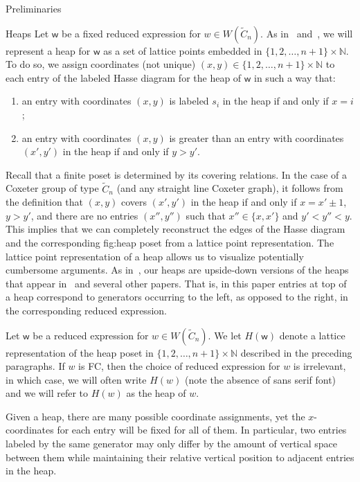 \documentclass[11pt]{amsart}
\theoremstyle{definition}
\numberwithin{equation}{section}
\newcommand{\N}{\mathbb{N}}
\newcommand{\C}{\widetilde{C}}
\renewcommand{\(}{\left(}
\renewcommand{\)}{\right)}
\newcommand{\w}{\mathsf{w}}
\begin{document}
\begin{section}{Preliminaries}
\begin{subsection}{Heaps}
Let $\w$ be a fixed reduced expression for $w \in W(\C_{n})$.  As in~\cite{Billey2007} and~\cite{Ernst2010}, we will represent a heap for $\w$ as a set of lattice points embedded in $\{1,2,\ldots,n+1\} \times \mathbb{N}$.  To do so, we assign coordinates (not unique) $(x,y) \in \{1,2,\ldots, n+1\} \times \mathbb{N}$ to each entry of the labeled Hasse diagram for the heap of $\w$ in such a way that:
\begin{enumerate}
\item an entry with coordinates $(x,y)$ is labeled $s_i$ in the heap if and only if $x = i$; 
\item an entry with coordinates $(x,y)$ is greater than an entry with coordinates $(x',y')$ in the heap if and only if $y > y'$.
\end{enumerate}
Recall that a finite poset is determined by its covering relations.  In the case of a Coxeter group of type $\C_{n}$ (and any straight line Coxeter graph), it follows from the definition that $(x,y)$ covers $(x',y')$ in the heap if and only if $x = x' \pm 1$, $y > y'$, and there are no entries $(x'', y'')$ such that $x'' \in \{x, x'\}$ and $y'< y'' < y$.  This implies that we can completely reconstruct the edges of the Hasse diagram and the corresponding fig:heap poset from a lattice point representation. The lattice point representation of a heap allows us to visualize potentially cumbersome arguments.  As in~\cite{Ernst2010}, our heaps are upside-down versions of the heaps that appear in~\cite{Billey2007} and several other papers.  That is, in this paper entries at top of a heap correspond to generators occurring to the left, as opposed to the right, in the corresponding reduced expression. 

Let $\w$ be a reduced expression for $w \in W(\C_{n})$.  We let $H(\w)$ denote a lattice representation of the heap poset in $\{1,2,\ldots,n+1\} \times \N$ described in the preceding paragraphs.  If $w$ is FC, then the choice of reduced expression for $w$ is irrelevant, in which case, we will often write $H(w)$ (note the absence of \textsf{sans serif} font) and we will refer to $H(w)$ as the heap of $w$.

Given a heap, there are many possible coordinate assignments, yet the $x$-coordinates for each entry will be fixed for all of them.  In particular, two entries labeled by the same generator may only differ by the amount of vertical space between them while maintaining their relative vertical position to adjacent entries in the heap.


\end{subsection}
\end{section}
\end{document}
